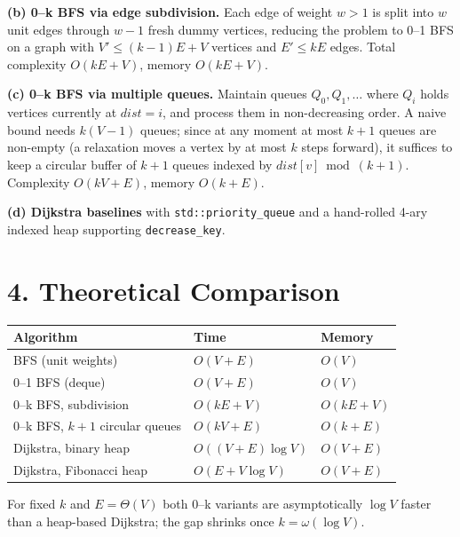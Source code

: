 \documentclass[11pt,a4paper]{article}
\begin{document}
\textbf{(b) 0--k BFS via edge subdivision.} Each edge of weight $w>1$ is split
into $w$ unit edges through $w-1$ fresh dummy vertices, reducing the problem
to 0--1 BFS on a graph with $V' \le (k-1)E+V$ vertices and $E' \le kE$ edges.
Total complexity $O(kE+V)$, memory $O(kE+V)$.

\textbf{(c) 0--k BFS via multiple queues.} Maintain queues $Q_0,Q_1,\dots$
where $Q_i$ holds vertices currently at $dist=i$, and process them in
non-decreasing order. A naive bound needs $k(V-1)$ queues; since at any moment
at most $k+1$ queues are non-empty (a relaxation moves a vertex by at most $k$
steps forward), it suffices to keep a circular buffer of $k+1$ queues indexed
by $dist[v] \bmod (k+1)$. Complexity $O(kV+E)$, memory $O(k+E)$.

\textbf{(d) Dijkstra baselines} with \texttt{std::priority\_queue} and a
hand-rolled 4-ary indexed heap supporting \texttt{decrease\_key}.

\section*{4. Theoretical Comparison}
\begin{center}
\begin{tabular}{lll}
\hline
Algorithm & Time & Memory \\ \hline
BFS (unit weights)              & $O(V+E)$           & $O(V)$ \\
0--1 BFS (deque)                & $O(V+E)$           & $O(V)$ \\
0--k BFS, subdivision           & $O(kE+V)$          & $O(kE+V)$ \\
0--k BFS, $k{+}1$ circular queues& $O(kV+E)$         & $O(k+E)$ \\
Dijkstra, binary heap           & $O((V+E)\log V)$   & $O(V+E)$ \\
Dijkstra, Fibonacci heap        & $O(E + V\log V)$   & $O(V+E)$ \\ \hline
\end{tabular}
\end{center}
For fixed $k$ and $E=\Theta(V)$ both 0--k variants are asymptotically
$\log V$ faster than a heap-based Dijkstra; the gap shrinks once $k = \omega(\log V)$.
\end{document}
